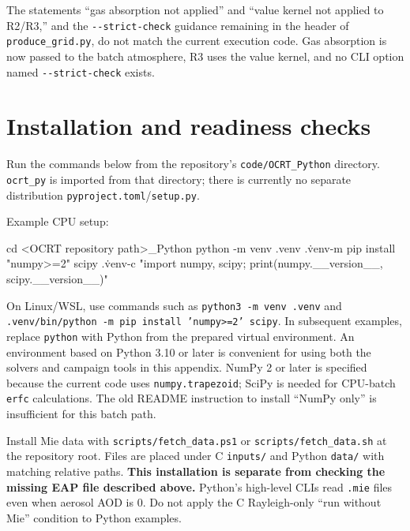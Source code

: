 The statements “gas absorption not applied” and “value kernel not applied to R2/R3,” and the \texttt{-\allowbreak{}-\allowbreak{}strict-\allowbreak{}check} guidance remaining in the header of \texttt{produce\_\allowbreak{}grid.\allowbreak{}py}, do not match the current execution code. Gas absorption is now passed to the batch atmosphere, R3 uses the value kernel, and no CLI option named \texttt{-\allowbreak{}-\allowbreak{}strict-\allowbreak{}check} exists.

\section{Installation and readiness checks}
\label{sec:auto:06_python_batch:2}
Run the commands below from the repository's \texttt{code/\allowbreak{}OCRT\_\allowbreak{}Python} directory. \texttt{ocrt\_\allowbreak{}py} is imported from that directory; there is currently no separate distribution \texttt{pyproject.\allowbreak{}toml}/\texttt{setup.\allowbreak{}py}.

Example CPU setup:


\begin{ManualCode}
cd <OCRT repository path>\code\OCRT_Python
python -m venv .venv
.\.venv\Scripts\python -m pip install "numpy>=2" scipy
.\.venv\Scripts\python -c "import numpy, scipy; print(numpy.__version__, scipy.__version__)"
\end{ManualCode}

On Linux/WSL, use commands such as \texttt{python3 -\allowbreak{}m venv .\allowbreak{}venv} and \texttt{.\allowbreak{}venv/\allowbreak{}bin/\allowbreak{}python -\allowbreak{}m pip install 'n\allowbreak{}umpy>=\allowbreak{}2' scipy}. In subsequent examples, replace \texttt{python} with Python from the prepared virtual environment. An environment based on Python 3.10 or later is convenient for using both the solvers and campaign tools in this appendix. NumPy 2 or later is specified because the current code uses \texttt{numpy.\allowbreak{}trapezoid}; SciPy is needed for CPU-batch \texttt{erfc} calculations. The old README instruction to install “NumPy only” is insufficient for this batch path.

Install Mie data with \texttt{scripts/\allowbreak{}fetch\_\allowbreak{}data.\allowbreak{}ps1} or \texttt{scripts/\allowbreak{}fetch\_\allowbreak{}data.\allowbreak{}sh} at the repository root. Files are placed under C \texttt{inputs/\allowbreak{}} and Python \texttt{data/\allowbreak{}} with matching relative paths. \textbf{This installation is separate from checking the missing EAP file described above.} Python's high-level CLIs read \texttt{.\allowbreak{}mie} files even when aerosol AOD is 0. Do not apply the C Rayleigh-only “run without Mie” condition to Python examples.

